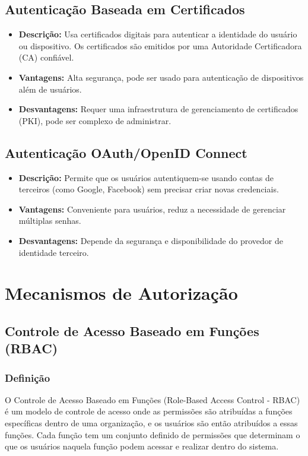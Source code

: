 \documentclass{scrartcl}
\begin{document}
\subsection{Autenticação Baseada em Certificados}
\label{sec:orged876ac}
\begin{itemize}
\item \textbf{\textbf{Descrição:}} Usa certificados digitais para autenticar a identidade do
usuário ou dispositivo. Os certificados são emitidos por uma Autoridade
Certificadora (CA) confiável.
\item \textbf{\textbf{Vantagens:}} Alta segurança, pode ser usado para autenticação de
dispositivos além de usuários.
\item \textbf{\textbf{Desvantagens:}} Requer uma infraestrutura de gerenciamento de
certificados (PKI), pode ser complexo de administrar.
\end{itemize}

\subsection{Autenticação OAuth/OpenID Connect}
\label{sec:org25b72c6}
\begin{itemize}
\item \textbf{\textbf{Descrição:}} Permite que os usuários autentiquem-se usando contas de
terceiros (como Google, Facebook) sem precisar criar novas credenciais.
\item \textbf{\textbf{Vantagens:}} Conveniente para usuários, reduz a necessidade de gerenciar
múltiplas senhas.
\item \textbf{\textbf{Desvantagens:}} Depende da segurança e disponibilidade do provedor de
identidade terceiro.
\end{itemize}

\section{Mecanismos de Autorização}
\label{sec:org2bcb5e1}
\subsection{Controle de Acesso Baseado em Funções (RBAC)}
\label{sec:org9c02cb5}
\subsubsection{Definição}
\label{sec:orgbbbcade}
O Controle de Acesso Baseado em Funções (Role-Based Access Control - RBAC) é um
modelo de controle de acesso onde as permissões são atribuídas a funções
específicas dentro de uma organização, e os usuários são então atribuídos a
essas funções. Cada função tem um conjunto definido de permissões que determinam
o que os usuários naquela função podem acessar e realizar dentro do sistema.
\end{document}

